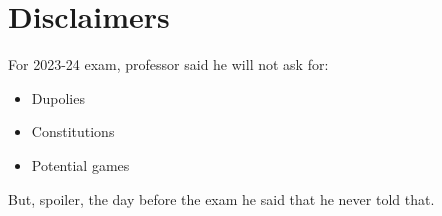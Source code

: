 \documentclass{article}
\begin{document}
\tableofcontents

\newpage
{} 


\newpage

\newpage

\newpage

\newpage

\newpage

\newpage

\newpage

\newpage

\newpage


\newpage

\newpage

\newpage

\newpage

\newpage

\newpage

\newpage

\newpage

\newpage

\newpage


\newpage




\newpage
\section{Disclaimers}
For 2023-24 exam, professor said he will not ask for:
\begin{itemize}
    \item Dupolies
    \item Constitutions
    \item Potential games
\end{itemize}
But, spoiler, the day before the exam he said that he never told that.
\end{document}
